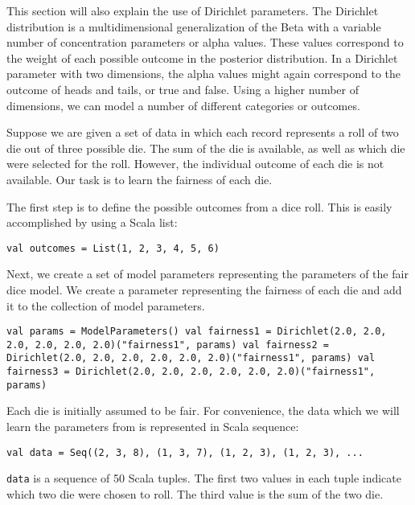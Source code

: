 This section will also explain the use of Dirichlet parameters. The Dirichlet distribution is a multidimensional generalization of the Beta with a variable number of concentration parameters or alpha values. These values correspond to the weight of each possible outcome in the posterior distribution. In a Dirichlet parameter with two dimensions, the alpha values might again correspond to the outcome of heads and tails, or true and false. Using a higher number of dimensions, we can model a number of different categories or outcomes.

Suppose we are given a set of data in which each record represents a roll of two die out of three possible die. The sum of the die is available, as well as which die were selected for the roll. However, the individual outcome of each die is not available. Our task is to learn the fairness of each die.

The first step is to define the possible outcomes from a dice roll. This is easily accomplished by using a Scala list:

\begin{flushleft}
\texttt{val outcomes = List(1, 2, 3, 4, 5, 6)}
\end{flushleft}

Next, we create a set of model parameters representing the parameters of the fair dice model. We create a parameter representing the fairness of each die and add it to the collection of model parameters.

\begin{flushleft}
\texttt{val params = ModelParameters()
\newline val fairness1 = Dirichlet(2.0, 2.0, 2.0, 2.0, 2.0, 2.0)("fairness1", params)
\newline val fairness2 = Dirichlet(2.0, 2.0, 2.0, 2.0, 2.0, 2.0)("fairness1", params) 
\newline val fairness3 = Dirichlet(2.0, 2.0, 2.0, 2.0, 2.0, 2.0)("fairness1", params) 
}
\end{flushleft}

Each die is initially assumed to be fair. For convenience, the data which we will learn the parameters from is represented in Scala sequence:

\begin{flushleft}
\texttt{val data = Seq((2, 3, 8), (1, 3, 7), (1, 2, 3), (1, 2, 3), ...}
\end{flushleft}

\texttt{data} is a sequence of 50 Scala tuples. The first two values in each tuple indicate which two die were chosen to roll. The third value is the sum of the two die.

